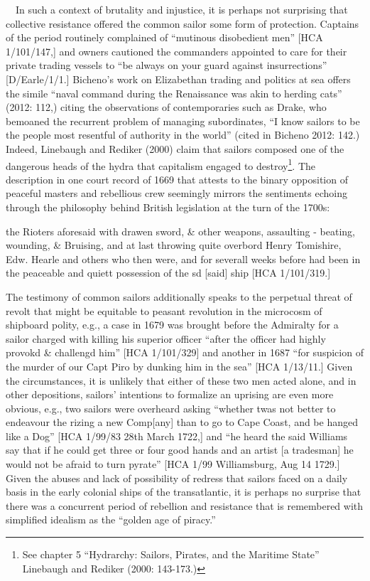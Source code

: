 \begin{styleStandard}
\ \ In such a context of brutality and injustice, it is perhaps not surprising that collective resistance offered the common sailor some form of protection. Captains of the period routinely complained of “mutinous disobedient men” [HCA 1/101/147,] and owners cautioned the commanders appointed to care for their private trading vessels to “be always on your guard against insurrections” [D/Earle/1/1.] Bicheno’s work on Elizabethan trading and politics at sea offers the simile “naval command during the Renaissance was akin to herding cats” (2012: 112,) citing the observations of contemporaries such as Drake, who bemoaned the recurrent problem of managing subordinates, “I know sailors to be the people most resentful of authority in the world” (cited in Bicheno 2012: 142.) Indeed, Linebaugh and Rediker (2000) claim that sailors composed one of the dangerous heads of the hydra that capitalism engaged to destroy\footnote{ See chapter 5 “Hydrarchy: Sailors, Pirates, and the Maritime State” Linebaugh and Rediker (2000: 143-173.)}. The description in one court record of 1669 that attests to the binary opposition of peaceful masters and rebellious crew seemingly mirrors the sentiments echoing through the philosophy behind British legislation at the turn of the 1700s:
\end{styleStandard}

\begin{styleStandard}
the Rioters aforesaid with drawen sword, \& other weapons, assaulting - beating, wounding, \& Bruising, and at last throwing quite overbord Henry Tomishire, Edw. Hearle and others who then were, and for severall weeks before had been in the peaceable and quiett possession of the sd [said] ship [HCA 1/101/319.] 
\end{styleStandard}

\begin{styleStandard}
The testimony of common sailors additionally speaks to the perpetual threat of revolt that might be equitable to peasant revolution in the microcosm of shipboard polity, e.g., a case in 1679 was brought before the Admiralty for a sailor charged with killing his superior officer “after the officer had highly provokd \& challengd him” [HCA 1/101/329] and another in 1687 “for suspicion of the murder of our Capt Piro by dunking him in the sea” [HCA 1/13/11.] Given the circumstances, it is unlikely that either of these two men acted alone, and in other depositions, sailors’ intentions to formalize an uprising are even more obvious, e.g., two sailors were overheard asking “whether twas not better to endeavour the rizing a new Comp[any] than to go to Cape Coast, and be hanged like a Dog” [HCA 1/99/83 28th March 1722,] and “he heard the said Williams say that if he could get three or four good hands and an artist [a tradesman] he would not be afraid to turn pyrate” [HCA 1/99 Williamsburg, Aug 14 1729.] Given the abuses and lack of possibility of redress that sailors faced on a daily basis in the early colonial ships of the transatlantic, it is perhaps no surprise that there was a concurrent period of rebellion and resistance that is remembered with simplified idealism as the “golden age of piracy.”
\end{styleStandard}

